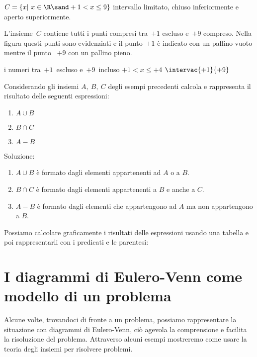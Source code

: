 {\begin{esempio}
\(C=\{x|~x \in \R \sand +1 < x \le 9\}\) intervallo limitato, 
chiuso inferiormente e aperto superiormente.

L'insieme~\(C\) contiene tutti i punti compresi tra~\(+1\) escluso 
e~\(+9\) compreso. 
Nella figura questi punti sono evidenziati e il punto~\(+1\) è 
indicato con un pallino vuoto mentre il punto ~\(+9\) con un pallino pieno.

\eseminter
{i numeri tra~\(+1\)~escluso e~\(+9\)~incluso}
{\(+1 < x \le +4\)}
{\(\intervac{+1}{+9}\)}
{}
\end{esempio}

\begin{esempio}\label{ese:insiemi_intervalli}
Considerando gli insiemi \(A,~B,~C\) degli esempi precedenti calcola e 
rappresenta il risultato delle seguenti espressioni:
\begin{multicols}{3}
\begin{enumerate} [nosep]
 \item \(A \cup B\)
 \item \(B \cap C\)
 \item \(A - B\)
\end{enumerate}
\end{multicols}
Soluzione:
\begin{enumerate} [nosep]
 \item \(A \cup B\) è formato dagli elementi appartenenti 
 ad \(A\) o a \(B\).
 \item \(B \cap C\) è formato dagli elementi appartenenti 
 a \(B\) e anche a \(C\).
 \item \(A - B\) è formato dagli elementi che appartengono 
 ad \(A\) ma non appartengono a \(B\).
\end{enumerate}
\vspace{1em}
Possiamo calcolare graficamente i risultati delle espressioni usando una 
tabella e poi rappresentarli con i predicati e le parentesi:
\begin{center}
\grafooperazioni
\end{center}
\end{esempio}

\section{I diagrammi di Eulero-Venn come modello di un problema}
\label{sec:insiemi_problemi}

Alcune volte, trovandoci di fronte a un problema, possiamo rappresentare
la situazione con diagrammi di Eulero-Venn, ciò agevola la
comprensione e facilita la risoluzione del problema. Attraverso alcuni
esempi mostreremo come usare la teoria degli insiemi per risolvere
problemi.

}
